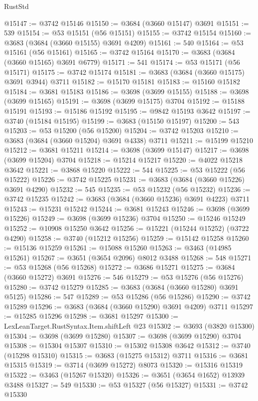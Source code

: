 \begin{lexlean}{RustStd}
\begin{coremodule}
{\begin{coremodule}
{{{{{{{{{{{{{{{{{{{{{{{{{{{{{{{{{{{{{{{{{{{{{{{@15147 := @3742 @15146
@15150 := @3684 (@3660 @15147) @3691
@15151 := 539
@15154 := @53 @15151 (@56 @15151)
@15155 := @3742 @15154
@15160 := @3683 (@3684 (@3660 @15155) @3691 @4209)
@15161 := 540
@15164 := @53 @15161 (@56 @15161)
@15165 := @3742 @15164
@15170 := @3683 (@3684 (@3660 @15165) @3691 @6779)
@15171 := 541
@15174 := @53 @15171 (@56 @15171)
@15175 := @3742 @15174
@15181 := @3683 (@3684 (@3660 @15175) @3691 @3944) @3711
@15182 := @15170 @15181
@15183 := @15160 @15182
@15184 := @3681 @15183
@15186 := @3698 (@3699 @15155)
@15188 := @3698 (@3699 @15165)
@15191 := @3698 (@3699 @15175) @3704
@15192 := @15188 @15191
@15193 := @15186 @15192
@15195 := @9842 @15193 @3642
@15197 := @3740 (@15184 @15195)
@15199 := @3683 (@15150 @15197)
@15200 := 543
@15203 := @53 @15200 (@56 @15200)
@15204 := @3742 @15203
@15210 := @3683 (@3684 (@3660 @15204) @3691 @4338) @3711
@15211 := @15199 @15210
@15212 := @3681 @15211
@15214 := @3698 (@3699 @15147)
@15217 := @3698 (@3699 @15204) @3704
@15218 := @15214 @15217
@15220 := @4022 @15218 @3642
@15221 := @3868 @15220
@15222 := 544
@15225 := @53 @15222 (@56 @15222)
@15226 := @3742 @15225
@15231 := @3683 (@3684 (@3660 @15226) @3691 @4290)
@15232 := 545
@15235 := @53 @15232 (@56 @15232)
@15236 := @3742 @15235
@15242 := @3683 (@3684 (@3660 @15236) @3691 @4223) @3711
@15243 := @15231 @15242
@15244 := @3681 @15243
@15246 := @3698 (@3699 @15226)
@15249 := @3698 (@3699 @15236) @3704
@15250 := @15246 @15249
@15252 := @10908 @15250 @3642
@15256 := @15221 (@15244 @15252) (@3722 @4290)
@15258 := @3740 (@15212 @15256)
@15259 := @15142 @15258
@15260 := @15136 @15259
@15261 := @15088 @15260
@15263 := @3463 (@14985 @15261)
@15267 := @3651 (@3654 @2096) @8012 @3488
@15268 := 548
@15271 := @53 @15268 (@56 @15268)
@15272 := @3686 @15271
@15275 := @3684 (@3660 @15272) @3691
@15276 := 546
@15279 := @53 @15276 (@56 @15276)
@15280 := @3742 @15279
@15285 := @3683 (@3684 (@3660 @15280) @3691 @5125)
@15286 := 547
@15289 := @53 @15286 (@56 @15286)
@15290 := @3742 @15289
@15296 := @3683 (@3684 (@3660 @15290) @3691 @4209) @3711
@15297 := @15285 @15296
@15298 := @3681 @15297
@15300 := LexLeanTarget.RustSyntax.Item.shiftLeft @23
@15302 := @3693 (@3820 @15300)
@15304 := @3698 (@3699 @15280)
@15307 := @3698 (@3699 @15290) @3704
@15308 := @15304 @15307
@15310 := @15302 @15308 @3642
@15312 := @3740 (@15298 @15310)
@15315 := @3683 (@15275 @15312) @3711
@15316 := @3681 @15315
@15319 := @3714 (@3699 @15272) @8073
@15320 := @15316 @15319
@15322 := @3463 (@15267 @15320)
@15326 := @3651 (@3654 @1652) @13939 @3488
@15327 := 549
@15330 := @53 @15327 (@56 @15327)
@15331 := @3742 @15330
}}}}}}}}}}}}}}}}}}}}}}}}}}}}}}}}}}}}}}}}}}}}}}}
\end{coremodule}}
\end{coremodule}
\end{lexlean}
